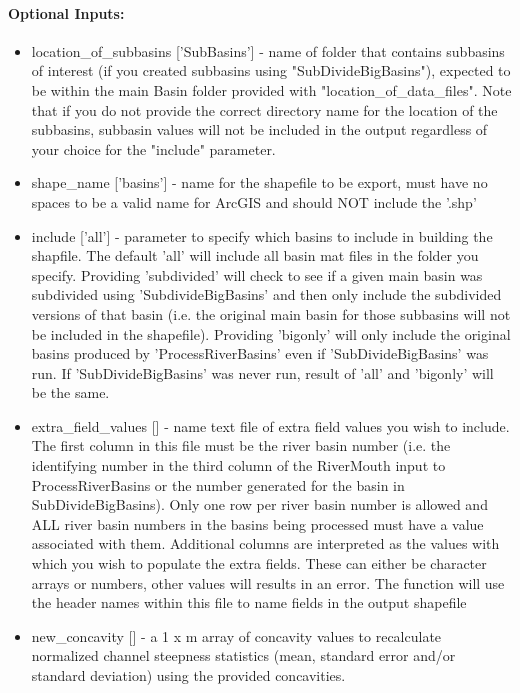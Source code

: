 \paragraph{Optional Inputs:}
\begin{itemize}
\item location\_of\_subbasins ['SubBasins'] - name of folder that contains subbasins of interest (if you created subbasins using
"SubDivideBigBasins"), expected to be within the main Basin folder provided with "location\_of\_data\_files". Note that if you do not provide
the correct directory name for the location of the subbasins, subbasin values will not be included in the output regardless of your choice
for the "include" parameter.
\item shape\_name ['basins'] - name for the shapefile to be export, must have no spaces to be a valid name for ArcGIS and should NOT include the '.shp'
\item include ['all'] - parameter to specify which basins to include in building the shapfile. The default 'all' will include all basin mat files in the 
folder you specify. Providing 'subdivided' will check to see if a given main basin was subdivided using 'SubdivideBigBasins' and then only include 
the subdivided versions of that basin (i.e. the original main basin for those subbasins will not be included in the shapefile). Providing 'bigonly'
will only include the original basins produced by 'ProcessRiverBasins' even if 'SubDivideBigBasins' was run. If 'SubDivideBigBasins' was never run,
result of 'all' and 'bigonly' will be the same.
\item extra\_field\_values [] - name text file of extra field values you wish to include. The first column in this file must be the river basin number
(i.e. the identifying number in the third column of the RiverMouth input to ProcessRiverBasins or the number generated for the basin in
SubDivideBigBasins). Only one row per river basin number is allowed and ALL river basin numbers in the basins being processed must have a value
associated with them. Additional columns are interpreted as the values with which you wish to populate the extra fields. These can either be character
arrays or numbers, other values will results in an error. The function will use the header names within this file to name fields in the output shapefile
\item new\_concavity [] - a 1 x m array of concavity values to recalculate normalized channel steepness statistics (mean, standard error and/or standard deviation) using the
provided concavities.

\end{itemize}
